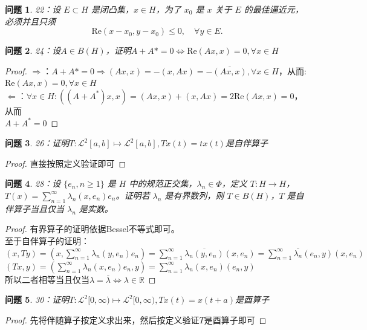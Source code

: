 \documentclass[a4paper, 12pt]{ctexart}
\newtheorem*{theorem}{问题}%
\begin{document}
\begin{theorem}
22：设 $E \subset H$ 是闭凸集，$x \in H$，为了 $x_0$ 是 $x$ 关于 $E$ 的最佳逼近元，必须并且只须
\[
\text{Re}(x - x_0, y - x_0) \leq 0, \quad \forall y \in E.
\]
\end{theorem}


\begin{theorem}
24：设$A \in B(H)$，证明$A+A*=0 \iff \text{Re}(Ax,x)=0,\forall x \in H$
\end{theorem}

\begin{proof}
$\Rightarrow$：$A+A*=0 \Rightarrow (Ax,x)=-(x,Ax)=-\overline{(Ax,x)},\forall x \in H$，从而: \\ 
$\text{Re}(Ax,x)=0,\forall x \in H$
\\
$\Leftarrow$：$\forall x\in H:((A+A^*)x,x)=(Ax,x)+(x,Ax)=2\text{Re}(Ax,x)=0$，从而 \\ $A+A^*=0$
\end{proof}

\begin{theorem}
26：证明$T:\mathscr{L}^2[a,b] \mapsto \mathscr{L}^2[a,b],Tx(t)=tx(t)$是自伴算子
\end{theorem}
\begin{proof}
直接按照定义验证即可
\end{proof}

\begin{theorem}
28：设 $\{e_n, n \geq 1\}$ 是 $H$ 中的规范正交集，$\lambda_n \in \Phi$，定义 $T: H \rightarrow H$，$T(x) = \sum_{n=1}^{\infty} \lambda_n(x, e_n)e_n$。证明若 $\lambda_n$ 是有界数列，则 $T \in B(H)$，$T$ 是自伴算子当且仅当 $\lambda_n$ 是实数。
\end{theorem}

\begin{proof}
有界算子的证明依据Bessel不等式即可。
\\ 
至于自伴算子的证明：\\ 
$(x,Ty)=(x,\sum_{n=1}^{\infty} \lambda_n(y,e_n)e_n)=\sum_{n=1}^{\infty} \overline{\lambda_n(y,e_n)}(x,e_n)=\sum_{n=1}^{\infty} \overline{\lambda_n}(e_n,y)(x,e_n)$
\\
$(Tx,y)=(\sum_{n=1}^{\infty} \lambda_n(x,e_n)e_n,y)=\sum_{n=1}^{\infty} {\lambda_n}(x,e_n)(e_n,y)$
\\ 所以二者相等当且仅当$\lambda=\overline{\lambda}\iff\lambda \in \mathbb{R}$
\end{proof}

\begin{theorem}
30：证明$T:\mathscr{L}^2[0,\infty) \mapsto \mathscr{L}^2[0,\infty),Tx(t)=x(t+a)$是酉算子
\end{theorem}
\begin{proof}
先将伴随算子按定义求出来，然后按定义验证$T$是酉算子即可
\end{proof}
\end{document}
